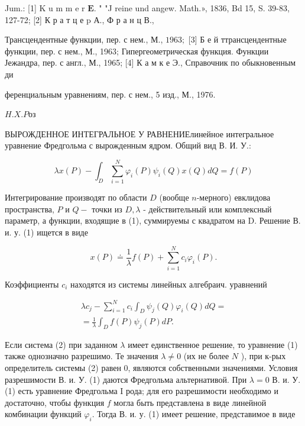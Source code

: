\documentclass[10pt]{article}
\begin{document}
Jum.: [1] K u m m e r $\mathbf{E}$. " "J reine und angew. Math.», 1836, Bd 15, S. 39-83, 127-72; [2] К р а т ц е p А., Ф р а н ц В.,

Трансцендентные функции, пер. с нем., М., $1963 ;$ [3] Б е й ттрансцендентные функции, пер. с нем., М., 1963; Гипергеометрическая функция. Функции Јежандра, пер. с англ., М., 1965; [4] К а м к е Э., Справочник по обыкновенным ди

ференциальным уравнениям, пер. с нем., 5 изд., М., 1976.

$H . X . P о з$



ВЫРОЖДЕННОЕ ИНТЕГРАЛЬНОЕ У РАВНЕНИЕлинейное интегральное уравнение Фредгольма с вырожденным ядром. Общий вид В. И. У.:



\[

\lambda x(P)-\int_{D} \sum_{i=1}^{N} \varphi_{i}(P) \psi_{i}(Q) x(Q) d Q=f(P)

\]



Интегрирование производят по области $D$ (вообще $n$-мерного) евклидова пространства, $P$ и $Q-$ точки из $D, \lambda$ - действительный или комплексный параметр, а функции, входящие в (1), суммируемы с квадратом на D. Решение В. и. у. (1) ищется в виде



\[

x(P) \doteq \frac{1}{\lambda} f(P)+\sum_{i=1}^{N} c_{i} \varphi_{i}(P) .

\]



Коэффициенты $c_{i}$ находятся из системы линейных алгебраич. уравнений



\[

\begin{gathered}

\lambda c_{j}-\sum_{i=1}^{N} c_{i} \int_{D} \psi_{j}(Q) \varphi_{i}(Q) d Q= \\

=\frac{1}{\lambda} \int_{D} f(P) \psi_{j}(P) d P .

\end{gathered}

\]



Если система (2) при заданном $\lambda$ имеет единственное решение, то уравнение (1) также однозначно разрешимо. Те значения $\lambda \neq 0$ (их не более $N$ ), при к-рых определитель системы (2) равен 0, являются собственными значениями. Условия разрешимости В. и. У. (1) даются Фредгольма альтернативой. При $\lambda=0$ В. и. У. (1) есть уравнение Фредгольма I рода; для его разрешимости необходимо и достаточно, чтобы функция $f$ могла быть представлена в виде линейной комбинации функций $\varphi_{i}$. Тогда В. и. у. (1) имеет решение, представимое в виде
\end{document}
